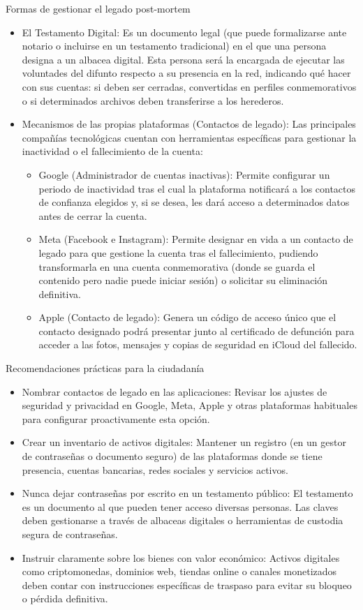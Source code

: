 \documentclass[
  spanish,
  a4paper,
  openany]{book}
\begin{document}
Formas de gestionar el legado post-mortem

\begin{itemize}
\item
  El Testamento Digital: Es un documento legal (que puede formalizarse ante notario o incluirse en un testamento tradicional) en el que una persona designa a un albacea digital. Esta persona será la encargada de ejecutar las voluntades del difunto respecto a su presencia en la red, indicando qué hacer con sus cuentas: si deben ser cerradas, convertidas en perfiles conmemorativos o si determinados archivos deben transferirse a los herederos.
\item
  Mecanismos de las propias plataformas (Contactos de legado): Las principales compañías tecnológicas cuentan con herramientas específicas para gestionar la inactividad o el fallecimiento de la cuenta:

  \begin{itemize}
  \item
    Google (Administrador de cuentas inactivas): Permite configurar un periodo de inactividad tras el cual la plataforma notificará a los contactos de confianza elegidos y, si se desea, les dará acceso a determinados datos antes de cerrar la cuenta.
  \item
    Meta (Facebook e Instagram): Permite designar en vida a un contacto de legado para que gestione la cuenta tras el fallecimiento, pudiendo transformarla en una cuenta conmemorativa (donde se guarda el contenido pero nadie puede iniciar sesión) o solicitar su eliminación definitiva.
  \item
    Apple (Contacto de legado): Genera un código de acceso único que el contacto designado podrá presentar junto al certificado de defunción para acceder a las fotos, mensajes y copias de seguridad en iCloud del fallecido.
  \end{itemize}
\end{itemize}

Recomendaciones prácticas para la ciudadanía

\begin{itemize}
\item
  Nombrar contactos de legado en las aplicaciones: Revisar los ajustes de seguridad y privacidad en Google, Meta, Apple y otras plataformas habituales para configurar proactivamente esta opción.
\item
  Crear un inventario de activos digitales: Mantener un registro (en un gestor de contraseñas o documento seguro) de las plataformas donde se tiene presencia, cuentas bancarias, redes sociales y servicios activos.
\item
  Nunca dejar contraseñas por escrito en un testamento público: El testamento es un documento al que pueden tener acceso diversas personas. Las claves deben gestionarse a través de albaceas digitales o herramientas de custodia segura de contraseñas.
\item
  Instruir claramente sobre los bienes con valor económico: Activos digitales como criptomonedas, dominios web, tiendas online o canales monetizados deben contar con instrucciones específicas de traspaso para evitar su bloqueo o pérdida definitiva.
\end{itemize}
\end{document}
